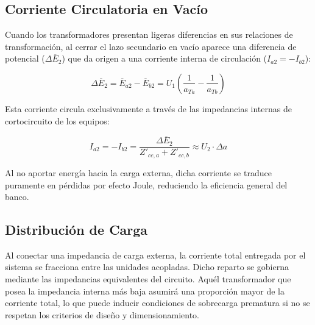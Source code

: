 \subsection{Corriente Circulatoria en Vacío}
Cuando los transformadores presentan ligeras diferencias en sus relaciones de transformación, al cerrar el lazo secundario en vacío aparece una diferencia de potencial ($\Delta \overline{E}_2$) que da origen a una corriente interna de circulación ($I_{a2} = -I_{b2}$):

$$\Delta \overline{E}_2 = \overline{E}_{a2} - \overline{E}_{b2} = U_1 \left( \frac{1}{a_{Ta}} - \frac{1}{a_{Tb}} \right)$$

Esta corriente circula exclusivamente a través de las impedancias internas de cortocircuito de los equipos:

$$I_{a2} = -I_{b2} = \frac{\Delta \overline{E}_2}{Z'_{cc,a} + Z'_{cc,b}} \approx U_2 \cdot \Delta a$$

Al no aportar energía hacia la carga externa, dicha corriente se traduce puramente en pérdidas por efecto Joule, reduciendo la eficiencia general del banco.

\subsection{Distribución de Carga}
Al conectar una impedancia de carga externa, la corriente total entregada por el sistema se fracciona entre las unidades acopladas. Dicho reparto se gobierna mediante las impedancias equivalentes del circuito. Aquél transformador que posea la impedancia interna más baja asumirá una proporción mayor de la corriente total, lo que puede inducir condiciones de sobrecarga prematura si no se respetan los criterios de diseño y dimensionamiento.


